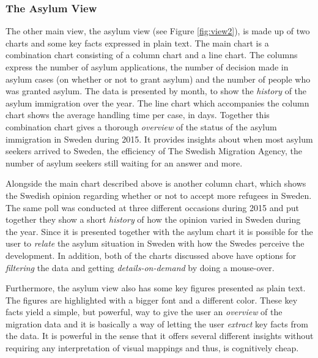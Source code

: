\documentclass{acmtog} %
\begin{document}
\subsubsection{The Asylum View}
\label{subsub:view2}
The other main view, the asylum view (see Figure \ref{fig:view2}), is made up of two charts and some key facts expressed in plain text. The main chart is a combination chart consisting of a column chart and a line chart. The columns express the number of asylum applications, the number of decision made in asylum cases (on whether or not to grant asylum) and the number of people who was granted asylum. The data is presented by month, to show the \emph{history} of the asylum immigration over the year. The line chart which accompanies the column chart shows the average handling time per case, in days. Together this combination chart gives a thorough \emph{overview} of the status of the asylum immigration in Sweden during 2015. It provides insights about when most asylum seekers arrived to Sweden, the efficiency of The Swedish Migration Agency, the number of asylum seekers still waiting for an answer and more.

Alongside the main chart described above is another column chart, which shows the Swedish opinion regarding whether or not to accept more refugees in Sweden. The same poll was conducted at three different occasions during 2015 and put together they show a short \emph{history} of how the opinion varied in Sweden during the year. Since it is presented together with the asylum chart it is possible for the user to \emph{relate} the asylum situation in Sweden with how the Swedes perceive the development. In addition, both of the charts discussed above have options for \emph{filtering} the data and getting \emph{details-on-demand} by doing a mouse-over.

Furthermore, the asylum view also has some key figures presented as plain text. The figures are highlighted with a bigger font and a different color. These key facts yield a simple, but powerful, way to give the user an \emph{overview} of the migration data and it is basically a way of letting the user \emph{extract} key facts from the data. It is powerful in the sense that it offers several different insights without requiring any interpretation of visual mappings and thus, is cognitively cheap.
\end{document}
